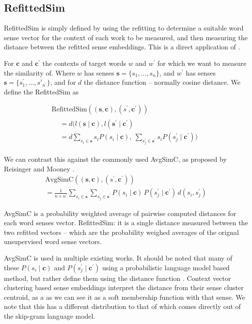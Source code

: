 \documentclass{sig-alternate}
\renewcommand{\c}{\mathbf{c}}
\newcommand{\s}{\mathbf{s}}
\begin{document}
\subsection{RefittedSim}\label{RefittedSimVsAvgSimC}
RefittedSim is simply defined by using the refitting to determine a suitable word sense vector for the context of each work to be measured, and then measuring the distance between the refitted sense embeddings.
This is a direct application of . 

For $\c$ and $\c^\prime$ the contexts of target words $w$ and $w^\prime$ for which we want to measure the similarity of. Where $w$ has senses $\s=\{s_1,...,s_n\}$, and $w^\prime$ has senses $\s=\{s^\prime_1,...,s\prime_{n^\prime}\}$, and for $d$ the distance function -- normally cosine distance. We define the RefittedSim as 

\begin{multline} \label{eq:refittedsim}
\mathrm{RefittedSim}((\s,\c),(s^{\prime},\c^{\prime}))\\
\begin{aligned}
&= d(l(\s \mid \c), l(\s^\prime \mid \c^\prime)\\
&= d
\sum_{s_{i}\in\s}s_{i}P(s_{i}\mid\c),\:
\sum_{s_{j}^{\prime}\in\s^{\prime}}s_{i}P(s_{j}^{\prime}\mid\c^{\prime}))
\end{aligned}
\end{multline}

We can contrast this against the commonly used AvgSimC, as proposed by Reisinger and Mooney \parencite{Reisinger2010}.
\begin{multline}
\mathrm{AvgSimC}((\s,\c),(s^{\prime},\c^{\prime})) \\
=  \frac{1}{n \times n^{\prime}}
\sum_{s_{i}\in\s}
\sum_{s_{j}^{\prime}\in\s^{\prime}}
P(s_{i}\mid\c)\,P(s_{j}^{\prime}\mid\c^{\prime})\,d(s_{i},s_{j}^{\prime})
\end{multline}

AvgSimC is a probability weighted average of pairwise computed distances for each word senses vector.
RefittedSim: it is a single distance measured between the two refitted vectors -- which are the probability weighed averages of the orignal unsupervised word sense vectors.

AvgSimC is used in multiple existing works. It should be noted that many of these  $P(s_{i}\mid\c)$ and $P(s_{j}^{\prime}\mid\c^\prime)$ using a probabilistic language model based method, but rather define them using the distance function \parencite{Reisinger2010, Huang2012}. Context vector clustering based sense embeddings interpret the distance from their sense cluster centroid, as a as we can see it as a soft membership function with that sense. We note that this has a different distribution to that of which comes directly out of the skip-gram language model.
\end{document}
